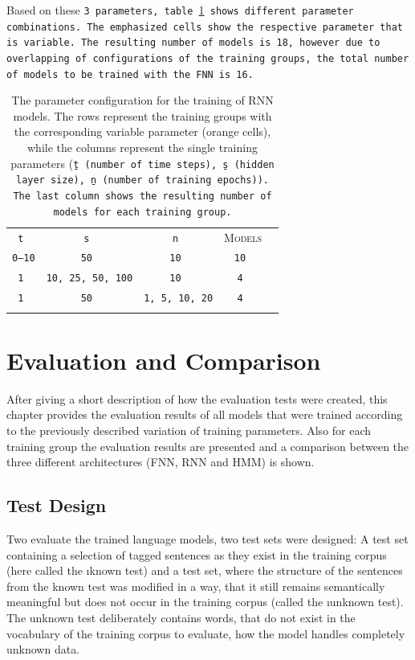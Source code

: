 Based on these \tt{3} parameters, table \ref{t.training.tuning.rnn} shows different parameter combinations. The emphasized cells show the respective parameter that is variable. The resulting number of models is \tt{18}, however due to overlapping of configurations of the training groups, the total number of models to be trained with the FNN is \tt{16}.

\begin{table}[ht]
	\vspace{2em}
	\centering\small{}\begin{tabular}{ c c c c c }
	\trule
	\tt{t} & \tt{s} & \tt{n} & \textsc{Models} \\
	\drule
	\cellcolor{orange}\color{white}\b{\tt{0}--\tt{10}} & \tt{50} & \tt{10} & \tt{10} \\
	\mrule
	\tt{1} & \cellcolor{orange}\color{white}\b{\tt{10}, \tt{25}, \tt{50}, \tt{100}} & \tt{10} & \tt{4} \\
	\mrule
	\tt{1} & \tt{50} & \cellcolor{orange}\color{white}\b{\tt{1}, \tt{5}, \tt{10}, \tt{20}} & \tt{4} \\
	\brule
	\end{tabular}
	\caption[Parameter combinations of RNN Models]{The parameter configuration for the training of RNN models. The rows represent the training groups with the corresponding variable parameter (orange cells), while the columns represent the single training parameters (\tt{\b{t}} (number of time steps), \tt{\b{s}} (hidden layer size), \tt{\b{n}} (number of training epochs)). The last column shows the resulting number of models for each training group.}
	\label{t.training.tuning.rnn}
\end{table}

\chapter{Evaluation and Comparison}\label{c.evaluation}
After giving a short description of how the evaluation tests were created, this chapter provides the evaluation results of all models that were trained according to the previously described variation of training parameters. Also for each training group the evaluation results are presented and a comparison between the three different architectures (FNN, RNN and HMM) is shown.

\section{Test Design}\label{c.evaluation.test}
Two evaluate the trained language models, two test sets were designed: A test set containing a selection of tagged sentences as they exist in the training corpus (here called the \i{known test}) and a test set, where the structure of the sentences from the known test was modified in a way, that it still remains semantically meaningful but does not occur in the training corpus (called the \i{unknown test}). The unknown test deliberately contains words, that do not exist in the vocabulary of the training corpus to evaluate, how the model handles completely unknown data.

